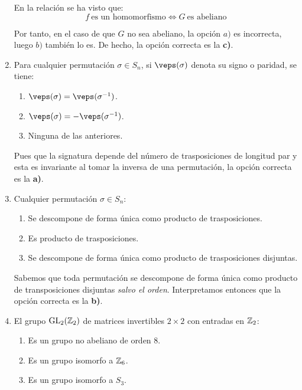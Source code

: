 \documentclass[12pt]{article}
\DeclareMathOperator{\GL}{GL}
\begin{document}
\begin{ejercicio}
\begin{enumerate}
            En la relación se ha visto que:
            \begin{equation*}
                f\ \text{es un homomorfismo}\Longleftrightarrow G\ \text{es abeliano}
            \end{equation*}

            Por tanto, en el caso de que $G$ no sea abeliano, la opción $a)$ es incorrecta, luego $b)$ también lo es. De hecho, la opción correcta es la \textbf{c)}.
            \item Para cualquier permutación $\sigma \in S_n$, si $\veps(\sigma)$ denota su signo o paridad, se tiene:
            \begin{enumerate}
                \item $\veps(\sigma) = \veps(\sigma^{-1})$.
                \item $\veps(\sigma) = -\veps(\sigma^{-1})$.
                \item Ninguna de las anteriores.
            \end{enumerate}

            Pues que la signatura depende del número de trasposiciones de longitud par y esta es invariante al tomar la inversa de una permutación, la opción correcta es la \textbf{a)}.
            \item Cualquier permutación $\sigma \in S_n$:
            \begin{enumerate}
                \item Se descompone de forma única como producto de trasposiciones.
                \item Es producto de trasposiciones.
                \item Se descompone de forma única como producto de trasposiciones disjuntas.
            \end{enumerate}

            Sabemos que toda permutación se descompone de forma única como producto de transposiciones disjuntas \emph{salvo el orden}. Interpretamos entonces que la opción correcta es la \textbf{b)}.
            \item El grupo $\GL_2(\bb{Z}_2)$ de matrices invertibles $2 \times 2$ con entradas en $\mathbb{Z}_2$:
            \begin{enumerate}
                \item Es un grupo no abeliano de orden 8.
                \item Es un grupo isomorfo a $\mathbb{Z}_6$.
                \item Es un grupo isomorfo a $S_3$.
            \end{enumerate}


\end{enumerate}
\end{ejercicio}
\end{document}
